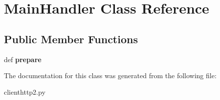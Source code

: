 \hypertarget{classclienthttp2_1_1_main_handler}{\section{Main\-Handler Class Reference}
\label{classclienthttp2_1_1_main_handler}
}
\subsection*{Public Member Functions}
\begin{DoxyCompactItemize}
\item 
\hypertarget{classclienthttp2_1_1_main_handler_a4def33e7e267224a32281b4c91dd72df}{def {\bfseries prepare}}\label{classclienthttp2_1_1_main_handler_a4def33e7e267224a32281b4c91dd72df}

\end{DoxyCompactItemize}


The documentation for this class was generated from the following file\-:\begin{DoxyCompactItemize}
\item 
clienthttp2.\-py\end{DoxyCompactItemize}
